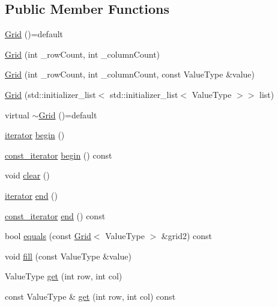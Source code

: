 \subsection*{Public Member Functions}
\begin{DoxyCompactItemize}
\item 
\mbox{\hyperlink{classGrid_ac9458fbc282411d7bbf8806fe5a0b863}{Grid}} ()=default
\item 
\mbox{\hyperlink{classGrid_ab865eead452bcf3a84e25937153b7635}{Grid}} (int \+\_\+row\+Count, int \+\_\+column\+Count)
\item 
\mbox{\hyperlink{classGrid_a172bec01c9ecb4e2b43899fa317396a6}{Grid}} (int \+\_\+row\+Count, int \+\_\+column\+Count, const Value\+Type \&value)
\item 
\mbox{\hyperlink{classGrid_a7700c2d2dc68587062f6696625802cd8}{Grid}} (std\+::initializer\+\_\+list$<$ std\+::initializer\+\_\+list$<$ Value\+Type $>$$>$ list)
\item 
virtual \mbox{\hyperlink{classGrid_a422a4b493ffd647fcf87ff31619127ba}{$\sim$\+Grid}} ()=default
\item 
\mbox{\hyperlink{classGrid_a438dbfd1a4dbef14e32131afd1bcb42f}{iterator}} \mbox{\hyperlink{classGrid_ad69bd11391be1a1dba5c8202259664f8}{begin}} ()
\item 
\mbox{\hyperlink{classGrid_aab30a5ff3fa2aff5b1f8b875438a3609}{const\+\_\+iterator}} \mbox{\hyperlink{classGrid_a29305669b60ca1680752e2fc3592ba99}{begin}} () const
\item 
void \mbox{\hyperlink{classGrid_ac8bb3912a3ce86b15842e79d0b421204}{clear}} ()
\item 
\mbox{\hyperlink{classGrid_a438dbfd1a4dbef14e32131afd1bcb42f}{iterator}} \mbox{\hyperlink{classGrid_acad38d52497a975bfb6f2f6acd76631f}{end}} ()
\item 
\mbox{\hyperlink{classGrid_aab30a5ff3fa2aff5b1f8b875438a3609}{const\+\_\+iterator}} \mbox{\hyperlink{classGrid_accf9a4bd0c34d4a5f6a7dab66ea10cdc}{end}} () const
\item 
bool \mbox{\hyperlink{classGrid_a9619d603ca957ce2be5b13198af5ee02}{equals}} (const \mbox{\hyperlink{classGrid}{Grid}}$<$ Value\+Type $>$ \&grid2) const
\item 
void \mbox{\hyperlink{classGrid_ac8f8ff1a5d0997596cbedbc2162e4649}{fill}} (const Value\+Type \&value)
\item 
Value\+Type \mbox{\hyperlink{classGrid_a49fcb88bae29483f4cb0858f29f6384e}{get}} (int row, int col)
\item 
const Value\+Type \& \mbox{\hyperlink{classGrid_a2b88a9c3e739296050588ad389667146}{get}} (int row, int col) const
$$
\end{DoxyCompactItemize}

